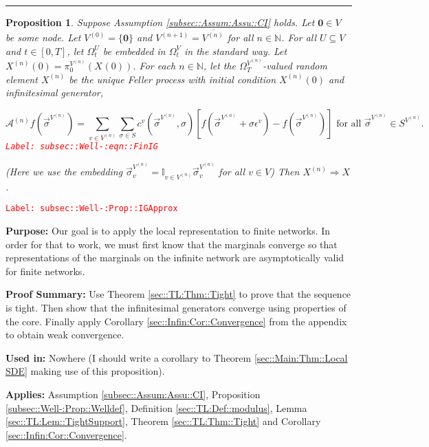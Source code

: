 \documentclass[12pt]{article}
\newcommand{\mb}{\mathbb}
\newcommand{\mc}{\mathcal}
\newcommand{\ov}{\overline}
\newcommand{\te}{\text}
\newcommand{\ep}{\epsilon}
\newcommand{\tr}{\textcolor{red}}
\newcommand{\labe}[1]{\tr{\texttt{Label: #1}}}
\newcommand{\purpose}{\textbf{Purpose: }}
\newcommand{\pfsum}{\textbf{Proof Summary: }}
\newcommand{\usein}{\textbf{Used in: }}
\newcommand{\app}{\textbf{Applies: }}
\newcommand{\lin}{\rule{\linewidth}{0.4 pt}}
\renewcommand{\root}{\mathbf{0}}				%
\renewcommand{\v}{v}							%
\renewcommand{\U}{U}							%
\renewcommand{\S}{S}							%
\newcommand{\s}{\sigma}							%
\newcommand{\sv}{\vec{\s}}						%
\newcommand{\ev}{\ep}							%
\newcommand{\T}{T}								%
\renewcommand{\t}{t}							%
\newcommand{\sset}{\Omega}						%
\newcommand{\proj}{\pi}							%
\newcommand{\X}{X}								%
\newcommand{\IG}{\mc{A}}						%
\newcommand{\IGr}{c}							%
\newcommand{\vind}[1]{^{#1}}					%
\newcommand{\carp}[1]{^{#1}}					%
\newcommand{\vsi}[1]{^{#1}}						%
\newcommand{\cind}[1]{_{#1}}					%
\newcommand{\cl}{\ov}							%
\newcommand{\tp}[1]{(#1)}						%
\newcommand{\tip}[1]{#1}						%
\newcommand{\ts}[1]{_{#1}}						%
\newcommand{\sln}[1]{^{(#1)}}						%
\newtheorem{prop}[thms]{Proposition}
\begin{document}
\lin

\begin{prop}
Suppose Assumption \ref{subsec::Assum:Assu::CI} holds. Let \(\root \in V\) be some node. Let \(V\sln{0} = \{\root\}\) and \(V\sln{n+1} = \cl{V\sln{n}}\) for all \(n \in \mb{N}\). For all \(\U \subseteq V\) and \(\t \in [0,\T]\), let \(\sset\vsi{\U}\ts{\t}\) be embedded in \(\sset\vsi{V}\ts{\t}\) in the standard way. Let \(\X\sln{n}\cind{}\tp{0} = \proj\vsi{V\sln{n}}\ts{0}(\X\cind{}\tp{0})\). For each \(n\in\mb{N}\), let the \(\sset\vsi{V\sln{n}}\ts{\T}\)-valued random element \(\X\sln{n}\cind{}\tip{}\) be the unique Feller process with initial condition \(\X\sln{n}\cind{}\tp{0}\) and infinitesimal generator,

\begin{equation}
\IG\sln{n}f(\sv\cind{}\vsi{V\sln{n}}) = \sum_{\v\in V\sln{n}}\sum_{\s\in \S} \IGr\vind{\v}(\sv\cind{}\vsi{V\sln{n}}, \s)[f(\sv\cind{}\vsi{V\sln{n}} + \s\ev\vind{\v}) - f(\sv\cind{}\vsi{V\sln{n}})]\te{ for all } \sv\cind{}\vsi{V\sln{n}} \in \S\carp{V\sln{n}}.
\label{subsec::Well-:eqn::FinIG}
\end{equation}
\labe{subsec::Well-:eqn::FinIG}

(Here we use the embedding \(\sv\cind{\v}\vsi{V\sln{n}} = \mb{I}_{\v\in V\sln{n}} \sv\cind{\v}\vsi{V\sln{n}}\) for all \(\v \in V\)) Then \(\X\sln{n}\cind{}\tip{} \Rightarrow \X\cind{}\tip{}\).
\label{subsec::Well-:Prop::IGApprox}
\end{prop}
\labe{subsec::Well-:Prop::IGApprox}

\purpose Our goal is to apply the local representation to finite networks. In order for that to work, we must first know that the marginals converge so that representations of the marginals on the infinite network are asymptotically valid for finite networks.

\pfsum Use Theorem \ref{sec::TL:Thm::Tight} to prove that the sequence is tight. Then show that the infinitesimal generators converge using properties of the core. Finally apply Corollary \ref{sec::Infin:Cor::Convergence} from the appendix to obtain weak convergence.

\usein Nowhere (I should write a corollary to Theorem \ref{sec::Main:Thm::Local SDE} making use of this proposition).

\app Assumption \ref{subsec::Assum:Assu::CI}, Proposition \ref{subsec::Well-:Prop::Welldef}, Definition \ref{sec::TL:Def::modulus}, Lemma \ref{sec::TL:Lem::TightSupport}, Theorem \ref{sec::TL:Thm::Tight} and Corollary \ref{sec::Infin:Cor::Convergence}.
\end{document}
